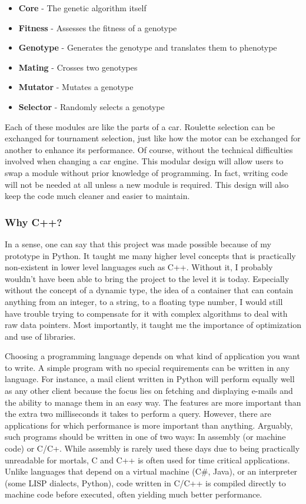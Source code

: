 \begin{itemize}
	\itemsep=0pt
	\item\textbf{Core} - The genetic algorithm itself
	\item\textbf{Fitness} - Assesses the fitness of a genotype
	\item\textbf{Genotype} - Generates the genotype and translates them to phenotype
	\item\textbf{Mating} - Crosses two genotypes
	\item\textbf{Mutator} - Mutates a genotype
	\item\textbf{Selector} - Randomly selects a genotype
\end{itemize}

Each of these modules are like the parts of a car. Roulette selection can be exchanged for tournament selection, just like how the motor can be exchanged for another to enhance its performance. Of course, without the technical difficulties involved when changing a car engine. This modular design will allow users to swap a module without prior knowledge of programming. In fact, writing code will not be needed at all unless a new module is required. This design will also keep the code much cleaner and easier to maintain.

\subsubsection{Why C++?}
In a sense, one can say that this project was made possible because of my prototype in Python. It taught me many higher level concepts that is practically non-existent in lower level languages such as C++. Without it, I probably wouldn't have been able to bring the project to the level it is today. Especially without the concept of a dynamic type, the idea of a container that can contain anything from an integer, to a string, to a floating type number, I would still have trouble trying to compensate for it with complex algorithms to deal with raw data pointers. Most importantly, it taught me the importance of optimization and use of libraries.

Choosing a programming language depends on what kind of application you want to write. A simple program with no special requirements can be written in any language. For instance, a mail client written in Python will perform equally well as any other client because the focus lies on fetching and displaying e-mails and the ability to manage them in an easy way. The features are more important than the extra two milliseconds it takes to perform a query. However, there are applications for which performance is more important than anything. Arguably, such programs should be written in one of two ways: In assembly (or machine code) or C/C+. While assembly is rarely used these days due to being practically unreadable for mortals, C and C++ is often used for time critical applications. Unlike languages that depend on a virtual machine (C\#, Java), or an interpreter (some LISP dialects, Python), code written in C/C++ is compiled directly to machine code before executed, often yielding much better performance.

